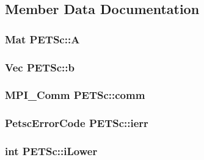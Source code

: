 \subsection{Member Data Documentation}
\subsubsection[{\texorpdfstring{A}{A}}]{\setlength{\rightskip}{0pt plus 5cm}Mat P\+E\+T\+Sc\+::A}\hypertarget{class_p_e_t_sc_ac0c11d39d7f2cb404d09e9facc570490}{}\label{class_p_e_t_sc_ac0c11d39d7f2cb404d09e9facc570490}
\subsubsection[{\texorpdfstring{b}{b}}]{\setlength{\rightskip}{0pt plus 5cm}Vec P\+E\+T\+Sc\+::b}\hypertarget{class_p_e_t_sc_a2d279ee0220f3887d53a800b12a05e6d}{}\label{class_p_e_t_sc_a2d279ee0220f3887d53a800b12a05e6d}
\subsubsection[{\texorpdfstring{comm}{comm}}]{\setlength{\rightskip}{0pt plus 5cm}M\+P\+I\+\_\+\+Comm P\+E\+T\+Sc\+::comm}\hypertarget{class_p_e_t_sc_ae9f8f11de0a89354d64f6582bbfa32cc}{}\label{class_p_e_t_sc_ae9f8f11de0a89354d64f6582bbfa32cc}
\subsubsection[{\texorpdfstring{ierr}{ierr}}]{\setlength{\rightskip}{0pt plus 5cm}Petsc\+Error\+Code P\+E\+T\+Sc\+::ierr}\hypertarget{class_p_e_t_sc_ab5800cd1d32b83ff6ea9a42992fe04e1}{}\label{class_p_e_t_sc_ab5800cd1d32b83ff6ea9a42992fe04e1}
\subsubsection[{\texorpdfstring{i\+Lower}{iLower}}]{\setlength{\rightskip}{0pt plus 5cm}int P\+E\+T\+Sc\+::i\+Lower}\hypertarget{class_p_e_t_sc_a1bf25d6e77444dd4d2668d9c155ca70a}{}\label{class_p_e_t_sc_a1bf25d6e77444dd4d2668d9c155ca70a}
